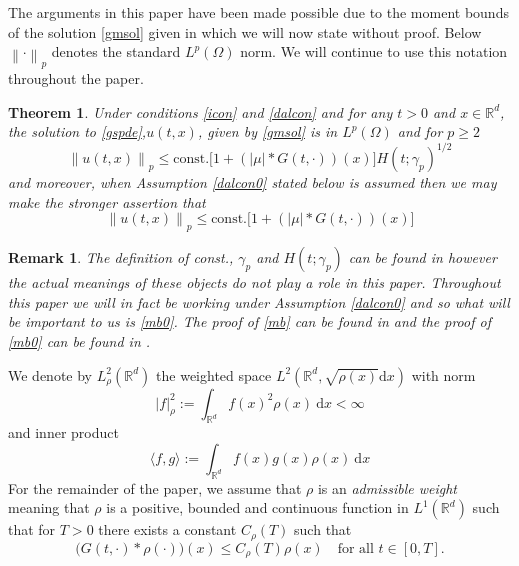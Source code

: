 \documentclass{article}
\newtheorem{theorem}{Theorem}[section]
\newtheorem{remark}{Remark}[section]
\numberwithin{equation}{section}
\newcommand{\R}{\mathbb{R}}
\newcommand{\Norm}[1]{\left\|  #1   \right\|}
\newcommand{\ud}{\ensuremath{\mathrm{d}}}
\begin{document}
The arguments in this paper have been made possible due to the moment bounds of the solution \eqref{gmsol} given in \cite{CH16Comparison} which we will now state without proof. Below $\Norm{\cdot}_p$ denotes the standard $L^p(\Omega)$ norm. We will continue to use this notation throughout the paper.\\

\begin{theorem} \textit{Under conditions \eqref{icon} and \eqref{dalcon} and for any $t>0$ and $x \in \R^d$, the solution to \eqref{gspde},$u(t,x)$, given by \eqref{gmsol} is in $L^p(\Omega)$ and for $p\ge 2$} 
\begin{equation}
	\Norm{u(t,x)}_p \le \text{const.}\big[1+(|\mu|*G(t,\cdot))(x)\big]H(t;\gamma_p)^{1/2} \label{mb}
\end{equation}
\textit{and moreover, when Assumption \ref{dalcon0} stated below is assumed then we may make the stronger assertion that}
\begin{equation}
\Norm{u(t,x)}_p \le \text{const.}\big[1+(|\mu|*G(t,\cdot))(x)\big] \label{mb0}
\end{equation} 
\end{theorem}

\begin{remark} \textit{The definition of \textup{const.}, $\gamma_p$ and $H(t;\gamma_p)$ can be found in \cite{CH16Comparison} however the actual meanings of these objects do not play a role in this paper. Throughout this paper we will in fact be working under Assumption \ref{dalcon0} and so what will be important to us is \eqref{mb0}. The proof of \eqref{mb} can be found in \cite{CH16Comparison} and the proof of \eqref{mb0} can be found in \cite{CK15SHE}.} 
\end{remark}

We denote by $L^2_\rho(\R^d)$ the weighted space $L^2(\R^d,\sqrt{\rho(x)}\ud x)$ with norm  
\begin{equation}
|f|_\rho^2 :=	\int_{\R^d}f(x)^2\rho(x) \: \ud x < \infty
\end{equation} 
and inner product 
\begin{equation}
\langle f,g \rangle  :=	\int_{\R^d}f(x)g(x)\rho(x) \: \ud x
\end{equation}
For the remainder of the paper, we assume that $\rho$ is an \textit{admissible weight} meaning that $\rho$ is a positive, bounded and continuous function in $L^1(\R^d)$ such that for $T>0$ there exists a constant $C_\rho(T)$ such that 
\begin{equation}
	\big(G(t,\cdot)*\rho(\cdot)\big)(x) \le C_\rho(T) \rho(x) \quad \text{for all $t\in[0,T]$.} \label{aw}
\end{equation}   
\end{document}
